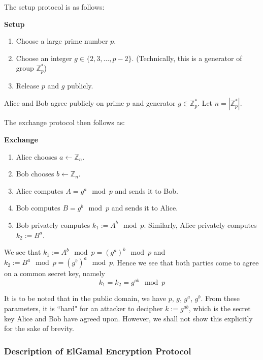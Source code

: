 The setup protocol is as follows:

\begin{tcolorbox}
\textbf{Setup} 

\begin{enumerate}
    \item Choose a large prime number \( p \).
    \item Choose an integer \( g \in \{2, 3, \ldots , p-2\} \). (Technically, this is a generator of group \( \mathbb{Z}^*_p \))
    \item Release \( p \) and \( g \) publicly.
\end{enumerate}
\end{tcolorbox}

Alice and Bob agree publicly on prime \( p \) and generator \( g \in \mathbb{Z}^*_p \). 
Let \( n = |\mathbb{Z}^*_p| \).

The exchange protocol then follows as:

\begin{tcolorbox}
\textbf{Exchange} 
\begin{enumerate}
    \item Alice chooses \( a \leftarrow \mathbb{Z}_n \). 
    \item Bob chooses \( b \leftarrow \mathbb{Z}_n \).
    \item Alice computes \( A = g^a \mod p \) and sends it to Bob.
    \item Bob computes \( B = g^b \mod p \) and sends it to Alice.
    \item Bob privately computes \( k_1 := A^b \mod p \). Similarly, Alice privately computes \( k_2 := B^a \).
\end{enumerate}
\end{tcolorbox}

We see that \( k_1 := A^b \mod p = (g^a)^b \mod p \) and \( k_2 := B^a \mod p = (g^b)^a \mod p \). Hence we see that both parties come to agree on a common secret key, namely
\begin{equation}
    k_1 = k_2 = g^{ab} \mod p
\end{equation}

It is to be noted that in the public domain, we have \( p \), \( g \), \( g^a \), \( g^b \). 
From these parameters, it is ``hard" for an attacker to decipher \( k := g^{ab} \), which is the secret key Alice and Bob have agreed upon. 
However, we shall not show this explicitly for the sake of brevity.

\subsubsection{Description of ElGamal Encryption Protocol}

